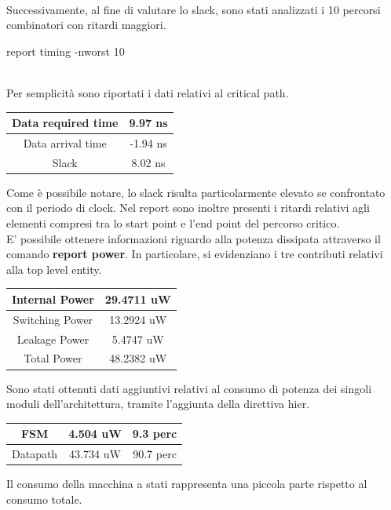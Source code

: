 \documentclass[11pt,  english, makeidx, a4paper, titlepage, oneside]{book}
\begin{document}
\\
Successivamente, al fine di valutare lo slack, sono stati analizzati i 10 percorsi combinatori con ritardi maggiori.
\\
\centerline{report timing -nworst 10}
\\
Per semplicità sono riportati i dati relativi al critical path.
\begin{center}
	\begin{tabular}{|c|c|}
	\hline
	Data required time & 9.97 ns \\
	\hline
	Data arrival time & -1.94 ns \\
	\hline
	Slack & 8.02 ns \\
	\hline
	\end{tabular}	
\end{center}
\vspace{0.3cm}  
Come è possibile notare, lo slack risulta particolarmente elevato se confrontato con il periodo di clock.
Nel report sono inoltre presenti i ritardi relativi agli elementi compresi tra lo start point e l'end point del percorso critico.
\\
E' possibile ottenere informazioni riguardo alla potenza dissipata attraverso il comando \textbf{report power}. In particolare, si evidenziano i tre contributi relativi alla top level entity.
\begin{center}
	\begin{tabular}{|c|c|}
	\hline
	Internal Power & 29.4711 uW \\
	\hline
	Switching Power & 13.2924 uW \\
	\hline
	Leakage Power & 5.4747 uW \\
	\hline
	Total Power & 48.2382 uW \\
	\hline
	\end{tabular}	
\end{center}
\vspace{0.3cm}  
Sono stati ottenuti dati aggiuntivi relativi al consumo di potenza dei singoli moduli dell'architettura, tramite l'aggiunta della direttiva hier.
\begin{center}
	\begin{tabular}{|c|c|c|}
	\hline
	FSM & 4.504 uW & 9.3 perc \\
	\hline
	Datapath & 43.734 uW & 90.7 perc \\
	\hline
	\end{tabular}	
\end{center}
\vspace{0.3cm}  
Il consumo della macchina a stati rappresenta una piccola parte rispetto al consumo totale.
\end{document}
